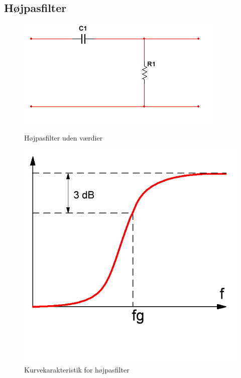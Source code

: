 \subsection{Højpasfilter}

\begin{figure}[H]
  \begin{minipage}{0.45\textwidth}
    \centering
      \includegraphics[width=\textwidth]{billeder/HWdesign/HP_UV}
      \caption{Højpasfilter uden værdier}
    \label{fig:HP_UV}
  \end{minipage}
  \hspace{0.1\textwidth}
  \begin{minipage}{0.45\textwidth}
    \centering
      \includegraphics[width=\textwidth]{billeder/HWdesign/HP_KURVE}
      \caption{Kurvekarakteristik for højpasfilter}
    \label{fig:HP_KURVE}
  \end{minipage}
\end{figure}

